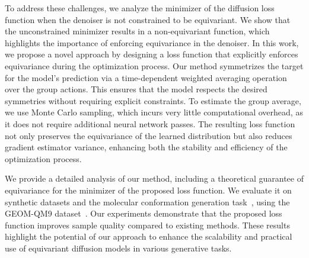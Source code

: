 To address these challenges, we analyze the minimizer of the diffusion loss function when the denoiser is not constrained to be equivariant. We show that the unconstrained minimizer results in a non-equivariant function, which highlights the importance of enforcing equivariance in the denoiser. In this work, we propose a novel approach by designing a loss function that explicitly enforces equivariance during the optimization process. Our method symmetrizes the target for the model's prediction via a time-dependent weighted averaging operation over the group actions. This ensures that the model respects the desired symmetries without requiring explicit constraints. To estimate the group average, we use Monte Carlo sampling, which incurs very little computational overhead, as it does not require additional neural network passes. The resulting loss function not only preserves the equivariance of the learned distribution but also reduces gradient estimator variance, enhancing both the stability and efficiency of the optimization process.

We provide a detailed analysis of our method, including a theoretical guarantee of equivariance for the minimizer of the proposed loss function. We evaluate it on synthetic datasets and the molecular conformation generation task~, using the GEOM-QM9 dataset~. Our experiments demonstrate that the proposed loss function improves sample quality compared to existing methods. These results highlight the potential of our approach to enhance the scalability and practical use of equivariant diffusion models in various generative tasks.



